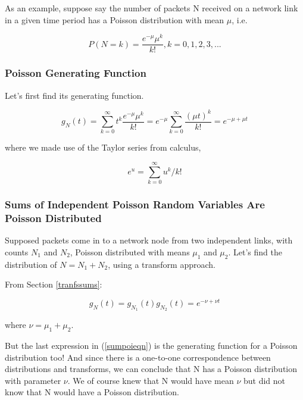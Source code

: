 As an example, suppose say the number of packets N received on a network
link in a given time period has a Poisson distribution with mean $\mu$,
i.e.

\begin{equation}
P(N = k) = \frac{e^{-\mu} \mu^k}{k!}, k = 0,1,2,3,...  
\end{equation}

\subsubsection{Poisson Generating Function}

Let's first find its generating function.

\begin{equation}
g_N(t) = \sum_{k=0}^{\infty} t^k  \frac{e^{-\mu} \mu^k}{k!} 
= e^{-\mu} \sum_{k=0}^{\infty} \frac{(\mu t)^k}{k!}
= e^{-\mu+\mu t}
\end{equation}

where we made use of the Taylor series from calculus,

\begin{equation}
e^u =  \sum_{k=0}^{\infty} u^k/k!
\end{equation}

\subsubsection{Sums of Independent Poisson Random Variables Are Poisson
Distributed}
\label{sumpoi}

Supposed packets come in to a network node from two independent links,
with counts $N_1$ and $N_2$, Poisson distributed with means $\mu_1$ and
$\mu_2$.  Let's find the distribution of $N = N_1+N_2$, using a
transform approach.

From Section \ref{tranfssums}:

\begin{equation}
\label{sumpoieqn}
g_N(t) = g_{N_1}(t) g_{N_2}(t) = e^{-\nu + \nu t}
\end{equation}

where $\nu = \mu_1 + \mu_2$.

But the last expression in (\ref{sumpoieqn}) is the generating function for
a Poisson distribution too!  And since there is a one-to-one
correspondence between distributions and transforms, we can conclude
that N has a Poisson distribution with parameter $\nu$.  We of
course knew that N would have mean $\nu$ but did not know that N would
have a Poisson distribution.

